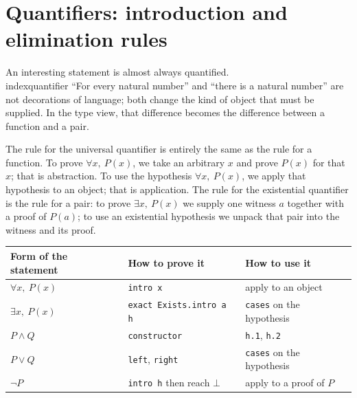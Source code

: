 \section{Quantifiers: introduction and elimination rules}


An interesting statement is almost always quantified.\\index{quantifier} ``For every natural
number'' and ``there is a natural number'' are not decorations of language; both change the kind of
object that must be supplied. In the type view, that difference becomes the difference between a
function and a pair.


The rule for the universal quantifier is entirely the same as the rule for a function. To prove
$\forall x,\ P(x)$, we take an arbitrary $x$ and prove $P(x)$ for that $x$; that is abstraction. To
use the hypothesis $\forall x,\ P(x)$, we apply that hypothesis to an object; that is application.
The rule for the existential quantifier is the rule for a pair: to prove $\exists x,\ P(x)$ we
supply one witness $a$ together with a proof of $P(a)$; to use an existential hypothesis we unpack
that pair into the witness and its proof.

\begin{center}
\begin{tabular}{lll}
\hline
Form of the statement & How to prove it & How to use it \\
\hline
$\forall x,\ P(x)$      & \texttt{intro x}              & apply to an object \\
$\exists x,\ P(x)$      & \texttt{exact Exists.intro a h} & \texttt{cases} on the hypothesis \\
$P\wedge Q$             & \texttt{constructor}          & \texttt{h.1}, \texttt{h.2} \\
$P\vee Q$               & \texttt{left}, \texttt{right} & \texttt{cases} on the hypothesis \\
$\neg P$                & \texttt{intro h} then reach $\bot$ & apply to a proof of $P$ \\
\hline
\end{tabular}
\end{center}

